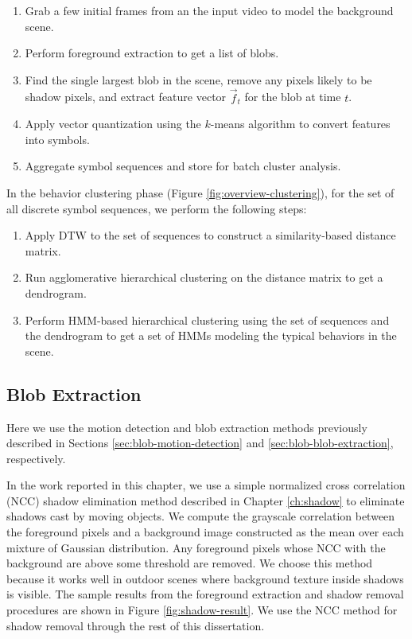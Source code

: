 \begin{enumerate}
  \item Grab a few initial frames from an the input video to model the
    background scene.
  \item Perform foreground extraction to get a list of blobs.
  \item Find the single largest blob in the scene, remove any pixels
    likely to be shadow pixels, and extract feature vector $\vec{f}_t$
    for the blob at time $t$.
  \item Apply vector quantization using the $k$-means algorithm to
    convert features into symbols.
  \item Aggregate symbol sequences and store for batch cluster
    analysis.
\end{enumerate}

In the behavior clustering phase
(Figure \ref{fig:overview-clustering}), for the set of all discrete
symbol sequences, we perform the following steps:

\begin{enumerate}
  \item Apply DTW to the set of sequences to construct a
    similarity-based distance matrix.
  \item Run agglomerative hierarchical clustering on the distance
    matrix to get a dendrogram.
  \item Perform HMM-based hierarchical clustering using the set of
    sequences and the dendrogram to get a set of HMMs modeling the
    typical behaviors in the scene.
\end{enumerate}

\subsection{Blob Extraction}
\label{sec:clustering-blob-extraction}

Here we use the motion detection and blob extraction methods
previously described in Sections \ref{sec:blob-motion-detection}
and \ref{sec:blob-blob-extraction}, respectively.

In the work reported in this chapter, we use a simple normalized cross
correlation (NCC) shadow elimination method described in
Chapter \ref{ch:shadow} to eliminate shadows cast by moving objects.
We compute the grayscale correlation between the foreground pixels and
a background image constructed as the mean over each mixture of
Gaussian distribution. Any foreground pixels whose NCC with the
background are above some threshold are removed. We choose this method
because it works well in outdoor scenes where background texture
inside shadows is visible.  The sample results from the foreground
extraction and shadow removal procedures are shown in
Figure \ref{fig:shadow-result}. We use the NCC method for shadow
removal through the rest of this dissertation.

